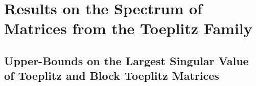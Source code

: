 \section{Results on the Spectrum of Matrices from the Toeplitz Family}
\label{section:ch5-results_on_the_spectrum_of_matrices_from_the_toeplitz_family}

\subsection{Upper-Bounds on the Largest Singular Value of Toeplitz and Block Toeplitz Matrices}
\label{subsection:ch5-upper_bounds_on_the_largest_singular_value_of_toeplitz_and_block_toeplitz_matrices}

